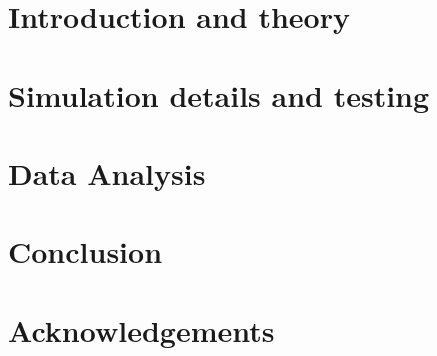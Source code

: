 \documentclass[a4paper, twoside, 11pt]{scrreprt}
\begin{document}
  

  \tableofcontents 
  \newpage

  \listoffigures
  \newpage

  \listoftables
  \newpage

  \null\thispagestyle{empty}  %
  \newpage


  \pagestyle{scrheadings} %
  \renewcommand{\chapterpagestyle}{plain} %



  \chapter{Introduction and theory}
    
  \newpage

  \chapter{Simulation details and testing}
    
  \newpage

  \null\thispagestyle{empty}  %
  \newpage

  \chapter{Data Analysis}
    
  \newpage

  

  \chapter{Conclusion}
    \pagestyle{plain} %
    \renewcommand{\chapterpagestyle}{plain} %
    
  \newpage

  \appendix
    
  \newpage

  \chapter*{Acknowledgements}
    
  \newpage

  \printbibliography
\end{document}
